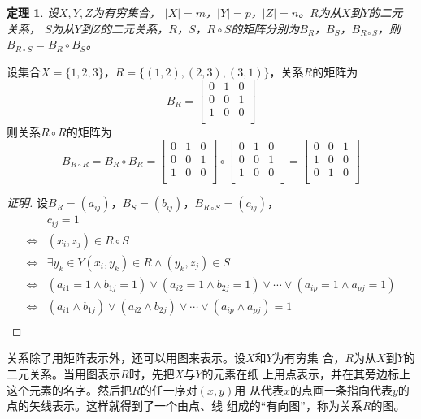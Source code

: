 \documentclass{book}[oneside]
\newtheorem{Thm}{定理}[chapter]
\begin{document}
\begin{CJK*}{UTF8}{gbsn}
  \begin{Thm}
    设$X, Y, Z$为有穷集合， $|X| =m$，$|Y|=p$，$|Z| = n$。$R$为从$X$到$Y$的二元
    关系， $S$为从$Y$到$Z$的二元关系，$R$，$S$，$R \circ S$的矩阵分别为$B_{R}$，$B_{S}$，$B_{R\circ S}$，则$B_{R\circ S} = B_R \circ B_S$。
  \end{Thm}
  设集合$X=\{1,2,3\}$，$R=\{(1,2),(2,3),(3,1)\}$，关系$R$的矩阵为
  \[B_R=\begin{bmatrix}
    0&1&0\\
    0&0&1\\
    1&0&0\\
  \end{bmatrix}
\]
则关系$R\circ R$的矩阵为
\[B_{R\circ R}=B_R\circ B_R=\begin{bmatrix}
  0&1&0\\
  0&0&1\\
  1&0&0\\
\end{bmatrix}
\circ
\begin{bmatrix}
  0&1&0\\
  0&0&1\\
  1&0&0\\
\end{bmatrix}
=\begin{bmatrix}
  0&0&1\\
  1&0&0\\
  0&1&0\\
\end{bmatrix}
\]
\begin{proof}[证明]
  设$B_{R}=(a_{ij})$，$B_{S}=(b_{ij})$，$B_{R\circ S}=(c_{ij})$，
\begin{align*}
  &c_{ij}=1\\
  \Leftrightarrow&(x_i,z_j)\in R\circ S\\
  \Leftrightarrow&\exists y_k\in Y (x_i,y_k)\in R\land (y_k,z_j)\in S\\
\Leftrightarrow&(a_{i1}=1\land b_{1j}=1)\lor (a_{i2}=1\land b_{2j}=1)\lor \cdots \lor (a_{ip}=1\land a_{pj}=1)\\
  \Leftrightarrow&(a_{i1}\land b_{1j})\lor (a_{i2}\land b_{2j})\lor \cdots \lor (a_{ip}\land a_{pj}) = 1\\
\end{align*}
\end{proof}

关系除了用矩阵表示外，还可以用图来表示。设$X$和$Y$为有穷集
合，$R$为从$X$到$Y$的二元关系。当用图表示$R$时，先把$X$与$Y$的元素在纸
上用点表示，并在其旁边标上这个元素的名字。然后把$R$的任一序对$(x,y)$用
从代表$x$的点画一条指向代表$y$的点的矢线表示。这样就得到了一个由点、线
组成的“有向图”，称为关系$R$的图。



\end{CJK*}
\end{document}
